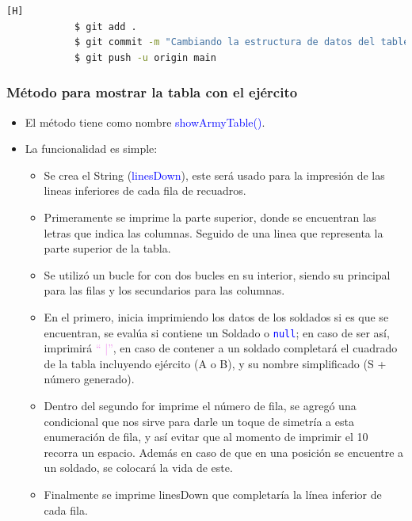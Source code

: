 \documentclass{article}
\begin{document}
        \begin{lstlisting}[language=bash,caption={Commit \href{https://github.com/hernanchoquehuanca/fp2-23b/commit/598a62d5d65db6832192e50b6ef383709a550043}{598a62d} - \href{https://github.com/hernanchoquehuanca/fp2-23b/commit/a9e7076e698a58a62ad7f89cd6c64a6f778b95e7}{a9e7076}: Se modificó el tipo de estructura para el tablero}][H]
    		$ git add .
    		$ git commit -m "Cambiando la estructura de datos del tablero principal, se volvio a utilizar ArrayList de ArrayList de soldados, esto para facilitar que el programa sea iterativo y la opcion de crear nuevos ejercitos sea optima"			
    		$ git push -u origin main
    	\end{lstlisting}
     
        
        \subsubsection{Método para mostrar la tabla con el ejército}

        \begin{itemize}
            \item El método tiene como nombre \textcolor{blue}{showArmyTable()}.
            \item La funcionalidad es simple:
            \begin{itemize}
                \item Se crea el String (\textcolor{blue}{linesDown}), este será usado para la impresión de las lineas inferiores de cada fila de recuadros.
                \item Primeramente se imprime la parte superior, donde se encuentran las letras que indica las columnas. Seguido de una linea que representa la parte superior de la tabla.
                \item Se utilizó un bucle for con dos bucles en su interior, siendo su principal para las filas y los secundarios para las columnas.
                \item En el primero, inicia imprimiendo los datos de los soldados si es que se encuentran, se evalúa si contiene un Soldado o \textcolor{blue}{\texttt{null}}; en caso de ser así, imprimirá \textcolor{violet}{`` |''}, en caso de contener a un soldado completará el cuadrado de la tabla incluyendo ejército (A o B), y su nombre simplificado (S + número generado). 
                \item Dentro del segundo for imprime el número de fila, se agregó una condicional que nos sirve para darle un toque de simetría a esta enumeración de fila, y así evitar que al momento de imprimir el 10 recorra un espacio. Además en caso de que en una posición se encuentre a un soldado, se colocará la vida de este.
                \item Finalmente se imprime linesDown que completaría la línea inferior de cada fila.
            \end{itemize}
        \end{itemize}
\newpage
        
        
\end{document}
